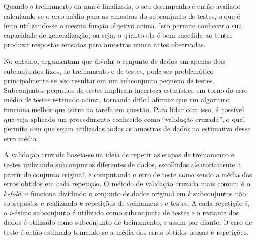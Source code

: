
Quando o treinamento da \acrshort{ann} é finalizado, o seu desempenho é então avaliado calculando-se o erro médio para as amostras do subconjunto de testes, o que é feito utilizando-se a mesma função objetivo acima.
Isso permite conhecer a sua capacidade de generalização, ou seja, o quanto ela é bem-sucedida ao tentar produzir respostas sensatas para amostras nunca antes observadas.




No entanto,  argumentam que dividir o conjunto de dados em apenas dois subconjuntos fixos, de treinamento e de testes, pode ser problemático principalmente se isso resultar em um subconjunto pequeno de testes.
Subconjuntos pequenos de testes implicam incerteza estatística em torno do erro médio de testes estimado acima, tornando difícil afirmar que um algoritmo funciona melhor que outro na tarefa em questão.
Para lidar com isso, é possível que seja aplicado um procedimento conhecido como ``validação cruzada'', o qual permite com que sejam utilizadas todas as amostras de dados na estimativa desse erro médio.

A validação cruzada baseia-se na ideia de repetir as etapas de treinamento e testes utilizando subconjuntos diferentes de dados, escolhidos aleatoriamente a partir do conjunto original, e computando o erro de teste como sendo a média dos erros obtidos em cada repetição. 
O método de validação cruzada mais comum é o \textit{\(k\)-fold}, e funciona dividindo o conjunto de dados original em \(k\) subconjuntos não sobrepostos e realizando \(k\) repetições de treinamento e testes. 
A cada repetição \(i\), o \(i\)-ésimo subconjunto é utilizado como subconjunto de testes e o restante dos dados é utilizado como subconjunto de treinamento, e assim por diante.
O erro de teste é então estimado tomando-se a média dos erros obtidos nessas \(k\) repetições.


